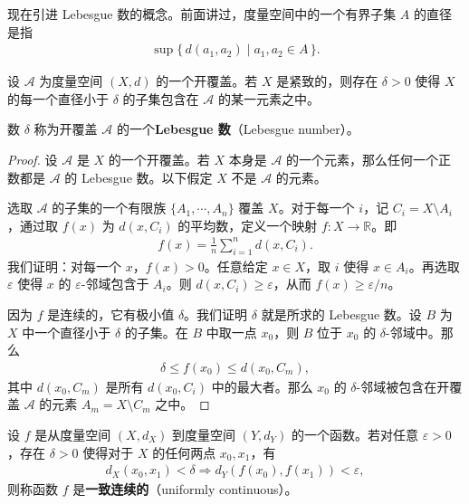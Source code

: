 现在引进 Lebesgue 数的概念。前面讲过，度量空间中的一个有界子集 $A$ 的直径是指
\begin{align*}
\sup\{\,d(a_{1},a_{2})\mid a_{1},a_{2}\in A\,\}.
\end{align*}

\begin{lemma}\label{lemma:ch03-lebesgue-number}
设 $\mathcal{A}$ 为度量空间 $(X,d)$ 的一个开覆盖。若 $X$ 是紧致的，则存在 $\delta>0$ 使得 $X$ 的每一个直径小于 $\delta$ 的子集包含在 $\mathcal{A}$ 的某一元素之中。

数 $\delta$ 称为开覆盖 $\mathcal{A}$ 的一个\textbf{Lebesgue 数}（Lebesgue number）。
\end{lemma}

\begin{proof}
设 $\mathcal{A}$ 是 $X$ 的一个开覆盖。若 $X$ 本身是 $\mathcal{A}$ 的一个元素，那么任何一个正数都是 $\mathcal{A}$ 的 Lebesgue 数。以下假定 $X$ 不是 $\mathcal{A}$ 的元素。

选取 $\mathcal{A}$ 的子集的一个有限族 $\{A_{1},\cdots,A_{n}\}$ 覆盖 $X$。对于每一个 $i$，记 $C_{i}=X\setminus A_{i}$，通过取 $f(x)$ 为 $d(x,C_{i})$ 的平均数，定义一个映射 $f\colon X\to\mathbb{R}$。即
\begin{align*}
f(x)=\frac{1}{n}\sum_{i=1}^{n}d(x,C_{i}).
\end{align*}
我们证明：对每一个 $x$，$f(x)>0$。任意给定 $x\in X$，取 $i$ 使得 $x\in A_{i}$。再选取 $\varepsilon$ 使得 $x$ 的 $\varepsilon$-邻域包含于 $A_{i}$。则 $d(x,C_{i})\geqslant\varepsilon$，从而 $f(x)\geqslant\varepsilon/n$。

因为 $f$ 是连续的，它有极小值 $\delta$。我们证明 $\delta$ 就是所求的 Lebesgue 数。设 $B$ 为 $X$ 中一个直径小于 $\delta$ 的子集。在 $B$ 中取一点 $x_{0}$，则 $B$ 位于 $x_{0}$ 的 $\delta$-邻域中。那么
\begin{align*}
\delta\leqslant f(x_{0})\leqslant d(x_{0},C_{m}),
\end{align*}
其中 $d(x_{0},C_{m})$ 是所有 $d(x_{0},C_{i})$ 中的最大者。那么 $x_{0}$ 的 $\delta$-邻域被包含在开覆盖 $\mathcal{A}$ 的元素 $A_{m}=X\setminus C_{m}$ 之中。
\end{proof}

\begin{definition}\label{definition:ch03-uniformly-continuous}
设 $f$ 是从度量空间 $(X,d_{X})$ 到度量空间 $(Y,d_{Y})$ 的一个函数。若对任意 $\varepsilon>0$，存在 $\delta>0$ 使得对于 $X$ 的任何两点 $x_{0},x_{1}$，有
\begin{align*}
d_{X}(x_{0},x_{1})<\delta\Longrightarrow d_{Y}(f(x_{0}),f(x_{1}))<\varepsilon,
\end{align*}
则称函数 $f$ 是\textbf{一致连续的}（uniformly continuous）。
\end{definition}

